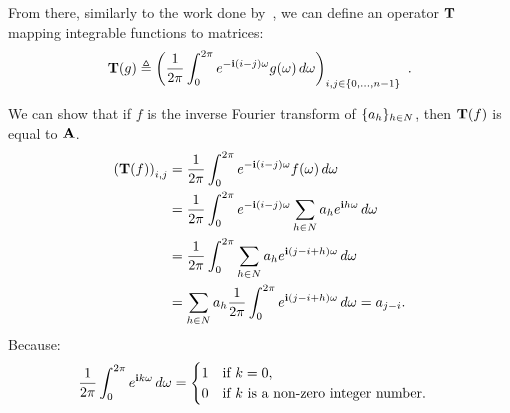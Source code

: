 \noindent
From there, similarly to the work done by~\citet{gray2006toeplitz}, we can define an operator $\mathbf{T}$ mapping integrable functions to matrices:
\begin{equation}
  \Tmat(g) \triangleq \leftmat\frac{1}{2\pi}\int_{0}^{2\pi}e^{-\ci(i-j)\omega}g(\omega)\,d\omega\rightmat_{i,j\in\{0,\ldots,n-1\}} \enspace.
  \label{equation:ch2-toeplitz_operator}
\end{equation}

\noindent
We can show that if $f$ is the inverse Fourier transform of $\{a_h\}_{h \in N}$, then $\mathbf{T}(f)$ is equal to $\mathbf{A}$.
\begingroup
\allowdisplaybreaks
  \begin{align}
      \leftmat \Tmat(f) \rightmat_{i, j} &= \frac{1}{2\pi} \int_0^{2\pi} e^{-\ci (i-j)\omega} f(\omega) \,d\omega  \\
      &= \frac{1}{2\pi} \int_0^{2\pi} e^{-\ci (i-j) \omega} \sum_{h \in N} a_h e^{\ci h \omega} \,d\omega  \\
      &= \frac{1}{2\pi} \int_0^{2\pi} \sum_{h \in N} a_h e^{\ci (j - i + h) \omega} \,d\omega  \\
      &= \sum_{h \in N} a_h \frac{1}{2\pi} \int_0^{2\pi} e^{\ci (j - i + h) \omega} \,d\omega 
      = a_{j-i} .
  \end{align}
\endgroup
Because:
\begin{equation}
  \frac{1}{2\pi} \int_0^{2\pi} e^{\mathbf{i} k \omega} \,d\omega = 
  \begin{cases}
    1 \quad \text{if}\ k = 0, \\
    0 \quad \text{if}\ k\ \text{is a non-zero integer number.}
  \end{cases}
\end{equation}




